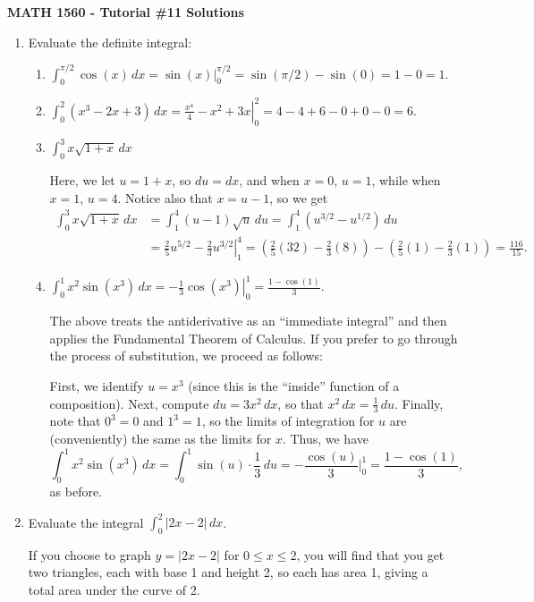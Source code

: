 \documentclass[12pt]{article}
\newcommand{\di}{\displaystyle}
\newcommand{\abs}[1]{\lvert #1\rvert}
\begin{document}
\author{Instructor: Sean Fitzpatrick}
\thispagestyle{empty}
\begin{center}
{\bf MATH 1560 - Tutorial \#11 Solutions}
\end{center}

\begin{enumerate}
\item Evaluate the definite integral:
\begin{enumerate}
\item $\di \int_0^{\pi/2}\cos(x)\,dx = \left.\sin(x)\right|_0^{\pi/2}=\sin(\pi/2)-\sin(0)=1-0=1.$

\item $\di \int_0^2(x^3-2x+3)\,dx = \left.\frac{x^4}{4}-x^2+3x\right|_0^2=4-4+6-0+0-0=6.$


\item $\di \int_0^3 x\sqrt{1+x}\,dx$

Here, we let $u=1+x$, so $du=dx$, and when $x=0$, $u=1$, while when $x=1$, $u=4$. Notice also that $x=u-1$, so we get
\begin{align*}
\int_0^3x\sqrt{1+x}\,dx &= \int_1^4(u-1)\sqrt{u}\,du = \int_1^4 (u^{3/2}-u^{1/2})\,du\\
& =\left.\frac25 u^{5/2}-\frac23 u^{3/2}\right|_1^4 = \left(\frac25(32)-\frac23(8)\right)-\left(\frac25(1)-\frac23(1)\right) =\frac{116}{15}.
\end{align*}

\item $\di \int_0^1 x^2\sin(x^3)\,dx = \left.-\frac13\cos(x^3)\right|_0^1 = \frac{1-\cos(1)}{3}.$

The above treats the antiderivative as an ``immediate integral'' and then applies the Fundamental Theorem of Calculus. If you prefer to go through the process of substitution, we proceed as follows:

First, we identify $u=x^3$ (since this is the ``inside'' function of a composition). Next, compute $du = 3x^2\,dx$, so that $x^2\,dx = \frac13\,du$. Finally, note that $0^3=0$ and $1^3=1$, so the limits of integration for $u$ are (conveniently) the same as the limits for $x$. Thus, we have
\[
\int_0^1 x^2\sin(x^3)\,dx = \int_0^1 \sin(u)\cdot \frac13 \,du = -\frac{\cos(u)}{3}|_0^1 = \frac{1-\cos(1)}{3},
\]
as before.
\end{enumerate}

\newpage

\item Evaluate the integral $\di \int_0^2 \abs{2x-2}\,dx$.
 
If you choose to graph $y=\abs{2x-2}$ for $0\leq x\leq 2$, you will find that you get two triangles, each with base 1 and height 2, so each has area 1, giving a total area under the curve of 2.


\end{enumerate}
\end{document}

